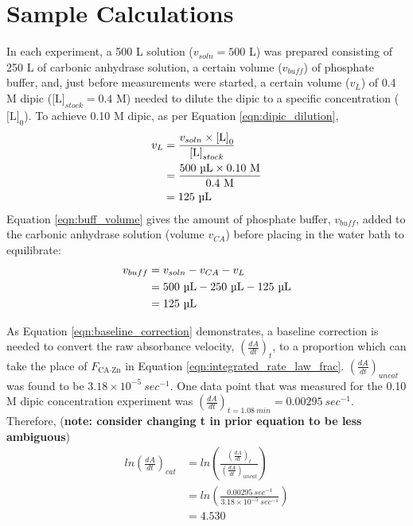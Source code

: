 \section{Sample Calculations}
In each experiment, a 500 {\textmu}L solution ($v_{soln}=500$ {\textmu}L) was prepared consisting of 250 {\textmu}L of carbonic anhydrase solution, a certain volume ($v_{buff}$) of phosphate buffer, and, just before measurements were started, a certain volume ($v_{L}$) of 0.4 M dipic ($\text{[L]}_{stock}=0.4$ M) needed to dilute the dipic to a specific concentration ($\text{[L]}_0$). To achieve 0.10 M dipic, as per Equation \eqref{eqn:dipic_dilution},
\begin{equation*}
\begin{split}
v_L&=\frac{v_{soln} \times \text{[L]}_0}{\text{[L]}_{stock}}\\
&=\frac{500\text{ {\textmu}L} \times 0.10\text{ M}}{0.4\text{ M}}\\
&=125\text{ {\textmu}L}
\end{split}
\end{equation*}
Equation \eqref{eqn:buff_volume} gives the amount of phosphate buffer, $v_{buff}$, added to the carbonic anhydrase solution (volume $v_{CA}$) before placing in the water bath to equilibrate:
\begin{equation*}
\begin{split}
v_{buff}&=v_{soln}-v_{CA}-v_L\\
&=500\text{ {\textmu}L}-250\text{ {\textmu}L}-125\text{ {\textmu}L}\\
&=125\text{ {\textmu}L}
\end{split}
\end{equation*}

As Equation \eqref{eqn:baseline_correction} demonstrates, a baseline correction is needed to convert the raw absorbance velocity, $\left(\frac{dA}{dt}\right)_{t}$, to a proportion which can take the place of $F_\text{CA$\cdot$Zn}$ in Equation \eqref{eqn:integrated_rate_law_frac}. $\left(\frac{dA}{dt}\right)_{uncat}$ was found to be $3.18\times10^{-5}\ sec^{-1}$. One data point that was measured for the 0.10 M dipic concentration experiment was $\left(\frac{dA}{dt}\right)_{t=1.08\ min}=0.00295\ sec^{-1}$. Therefore, (\textbf{note: consider changing t in prior equation to be less ambiguous})
\begin{equation*}
\begin{split}
ln \left(\frac{dA}{dt}\right)_{cat}
&= ln \left( \frac{ \left (\frac{dA}{dt}\right)_{t} }{ \left (\frac{dA}{dt}\right)_{uncat} } \right) \\
&= ln \left( \frac{ 0.00295\ sec^{-1} }{ 3.18\times10^{-5}\ sec^{-1} } \right) \\
&= 4.530
\end{split}
\end{equation*}

